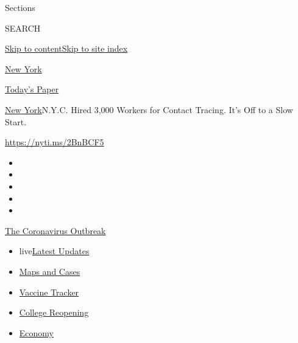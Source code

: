 Sections

SEARCH

\protect\hyperlink{site-content}{Skip to
content}\protect\hyperlink{site-index}{Skip to site index}

\href{https://www.nytimes.com/section/nyregion}{New York}

\href{https://myaccount.nytimes.com/auth/login?response_type=cookie\&client_id=vi}{}

\href{https://www.nytimes.com/section/todayspaper}{Today's Paper}

\href{/section/nyregion}{New York}\textbar{}N.Y.C. Hired 3,000 Workers
for Contact Tracing. It's Off to a Slow Start.

\url{https://nyti.ms/2BnBCF5}

\begin{itemize}
\item
\item
\item
\item
\item
\end{itemize}

\href{https://www.nytimes.com/news-event/coronavirus?action=click\&pgtype=Article\&state=default\&region=TOP_BANNER\&context=storylines_menu}{The
Coronavirus Outbreak}

\begin{itemize}
\tightlist
\item
  live\href{https://www.nytimes.com/2020/08/04/world/coronavirus-cases.html?action=click\&pgtype=Article\&state=default\&region=TOP_BANNER\&context=storylines_menu}{Latest
  Updates}
\item
  \href{https://www.nytimes.com/interactive/2020/us/coronavirus-us-cases.html?action=click\&pgtype=Article\&state=default\&region=TOP_BANNER\&context=storylines_menu}{Maps
  and Cases}
\item
  \href{https://www.nytimes.com/interactive/2020/science/coronavirus-vaccine-tracker.html?action=click\&pgtype=Article\&state=default\&region=TOP_BANNER\&context=storylines_menu}{Vaccine
  Tracker}
\item
  \href{https://www.nytimes.com/2020/08/02/us/covid-college-reopening.html?action=click\&pgtype=Article\&state=default\&region=TOP_BANNER\&context=storylines_menu}{College
  Reopening}
\item
  \href{https://www.nytimes.com/live/2020/08/04/business/stock-market-today-coronavirus?action=click\&pgtype=Article\&state=default\&region=TOP_BANNER\&context=storylines_menu}{Economy}
\end{itemize}

